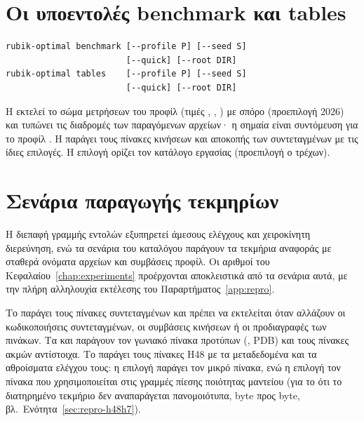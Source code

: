 \section{Οι υποεντολές benchmark και tables}
\label{sec:cli-benchmark}

\begin{verbatim}
rubik-optimal benchmark [--profile P] [--seed S]
                        [--quick] [--root DIR]
rubik-optimal tables    [--profile P] [--seed S]
                        [--quick] [--root DIR]
\end{verbatim}

Η  εκτελεί το σώμα μετρήσεων του προφίλ  (τιμές , , ) με σπόρο  (προεπιλογή 2026) και τυπώνει τις διαδρομές των παραγόμενων αρχείων· η σημαία  είναι συντόμευση για το προφίλ . Η  παράγει τους πίνακες κινήσεων και αποκοπής των συντεταγμένων με τις ίδιες επιλογές. Η επιλογή  ορίζει τον κατάλογο εργασίας (προεπιλογή ο τρέχων).

\section{Σενάρια παραγωγής τεκμηρίων}
\label{sec:cli-scripts}

Η διεπαφή γραμμής εντολών εξυπηρετεί άμεσους ελέγχους και χειροκίνητη διερεύνηση, ενώ τα σενάρια του καταλόγου  παράγουν τα τεκμήρια αναφοράς με σταθερά ονόματα αρχείων και συμβάσεις προφίλ. Οι αριθμοί του Κεφαλαίου~\ref{chap:experiments} προέρχονται αποκλειστικά από τα σενάρια αυτά, με την πλήρη αλληλουχία εκτέλεσης του Παραρτήματος~\ref{app:repro}.

Το  παράγει τους πίνακες συντεταγμένων και πρέπει να εκτελείται όταν αλλάζουν οι κωδικοποιήσεις συντεταγμένων, οι συμβάσεις κινήσεων ή οι προδιαγραφές των πινάκων. Τα  και  παράγουν τον γωνιακό πίνακα προτύπων (, PDB) και τους πίνακες ακμών αντίστοιχα. Το  παράγει τους πίνακες H48 με τα μεταδεδομένα και τα αθροίσματα ελέγχου τους: η επιλογή  παράγει τον μικρό πίνακα, ενώ η επιλογή  τον πίνακα  που χρησιμοποιείται στις γραμμές πίεσης ποιότητας μαντείου (για το ότι το διατηρημένο τεκμήριο δεν αναπαράγεται πανομοιότυπα, byte προς byte, βλ.\ Ενότητα~\ref{sec:repro-h48h7}).

